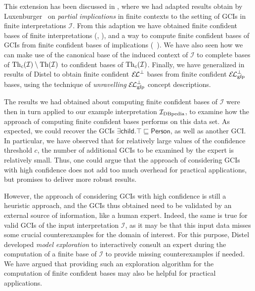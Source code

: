 This extension has been discussed in , where we had adapted
results obtain by Luxenburger~\cite{diss:Luxenburger} on \emph{partial implications} in
finite contexts to the setting of GCIs in finite interpretations $\mathcal{I}$.  From this
adaption we have obtained finite confident bases of finite interpretations
(, ), and a way to compute finite
confident bases of GCIs from finite confident bases of implications
(~).  We have also
seen how we can make use of the canonical base of the induced context of $\mathcal{I}$ to
complete bases of $\operatorname{Th}_{c}(\mathcal{I}) \setminus \operatorname{Th}(\mathcal{I})$ to confident bases of
$\operatorname{Th}_{c}(\mathcal{I})$.  Finally, we have generalized in 
results of Distel to obtain finite confident ${{\mathcal{E}\kern-.3ex\mathcal{L}}^\bot}$ bases from finite confident
${{\mathcal{E}\kern-.3ex\mathcal{L}}_\text{gfp}^\bot}$ bases, using the technique of \emph{unravelling} ${{\mathcal{E}\kern-.3ex\mathcal{L}}_\text{gfp}^\bot}$ concept
descriptions.

The results we had obtained about computing finite confident bases of $\mathcal{I}$ were
then in turn applied to our example interpretation ${\mathcal{I}_{\text{DBpedia}}}$, to examine how the
approach of computing finite confident bases performs on this data set.  As expected, we
could recover the GCIs $\exists \mathsf{child}. \top \sqsubseteq \mathsf{Person}$, as well
as another GCI.  In particular, we have observed that for relatively large values of the
confidence threshold $c$, the number of additional GCIs to be examined by the expert is
relatively small.  Thus, one could argue that the approach of considering GCIs with high
confidence does not add too much overhead for practical applications, but promises to
deliver more robust results.

However, the approach of considering GCIs with high confidence is still a heuristic
approach, and the GCIs thus obtained need to be validated by an external source of
information, like a human expert.  Indeed, the same is true for valid GCIs of the input
interpretation $\mathcal{I}$, as it may be that this input data misses some crucial
counterexamples for the domain of interest.  For this purpose, Distel developed
\emph{model exploration} to interactively consult an expert during the computation of a
finite base of $\mathcal{I}$ to provide missing counterexamples if needed.  We have argued
that providing such an exploration algorithm for the computation of finite confident bases
may also be helpful for practical applications.

